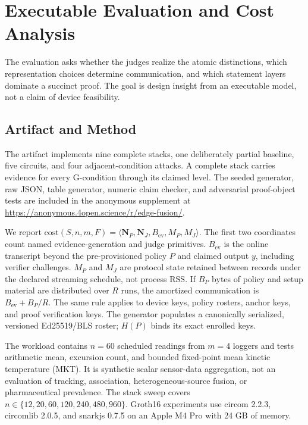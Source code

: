 \section{Executable Evaluation and Cost Analysis}
\label{sec:evidence}

The evaluation asks whether the judges realize the atomic distinctions, which
representation choices determine communication, and which statement layers
dominate a succinct proof. The goal is design insight from an executable model,
not a claim of device feasibility.

\subsection{Artifact and Method}
\label{sec:artifact}

The artifact implements nine complete stacks, one deliberately partial
baseline, five circuits, and four adjacent-condition attacks. A complete stack
carries evidence for every G-condition through its claimed level. The seeded
generator, raw JSON, table generator, numeric claim checker, and adversarial
proof-object tests are included in the anonymous supplement at
\url{https://anonymous.4open.science/r/edge-fusion/}.

We report
$\mathrm{cost}(S,n,m,F)=\langle\mathbf{N}_{P},\mathbf{N}_{J},
B_{\mathrm{ev}},M_P,M_J\rangle$. The first two coordinates count named
evidence-generation and judge primitives. $B_{\mathrm{ev}}$ is the online
transcript beyond the pre-provisioned policy $P$ and claimed output $y$,
including verifier challenges. $M_P$ and $M_J$ are protocol state retained
between records under the declared streaming schedule, not process RSS. If
$B_P$ bytes of policy and setup material are distributed over $R$ runs, the
amortized communication is $B_{\mathrm{ev}}+B_P/R$. The same rule applies to
device keys, policy rosters, anchor keys, and proof verification keys.
The generator populates a canonically serialized, versioned Ed25519/BLS roster;
$H(P)$ binds its exact enrolled keys.

The workload contains $n=60$ scheduled readings from $m=4$ loggers and tests
arithmetic mean, excursion count, and bounded fixed-point mean kinetic
temperature (MKT). It is synthetic scalar sensor-data aggregation, not an
evaluation of tracking, association, heterogeneous-source fusion, or
pharmaceutical prevalence. The stack sweep covers
$n\in\{12,20,60,120,240,480,960\}$. Groth16 experiments use circom 2.2.3,
circomlib 2.0.5, and snarkjs 0.7.5 on an Apple M4 Pro with 24 GB of memory.

